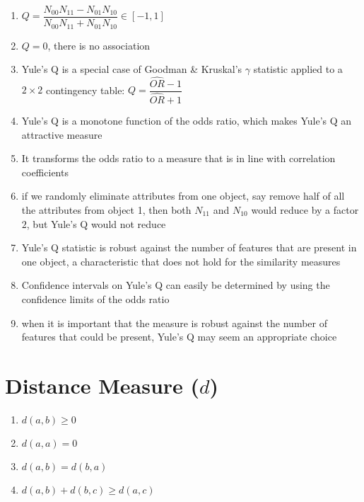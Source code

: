 \begin{enumerate}
    \item[] $Q = \dfrac{N_{00}N_{11} - N_{01}N_{10}}{N_{00}N_{11} + N_{01}N_{10}} \in [-1,1]$

    \item $Q = 0$, there is no association

    \item Yule’s Q is a special case of Goodman \& Kruskal’s $\gamma$ statistic applied to a $2 \times 2$ contingency table: $Q = \dfrac{\hat{OR} - 1}{\hat{OR} + 1}$

    \item Yule’s Q is a monotone function of the odds ratio, which makes Yule’s Q an attractive measure

    \item It transforms the odds ratio to a measure that is in line with correlation coefficients

    \item if we randomly eliminate attributes from one object, say remove half of all the attributes from object 1, then both $N_{11}$ and $N_{10}$ would reduce by a factor $2$, but Yule’s Q would not reduce

    \item Yule’s Q statistic is robust against the number of features that are present in one object, a characteristic that does not hold for the similarity measures

    \item Confidence intervals on Yule’s Q can easily be determined by using the confidence limits of the odds ratio

    \item when it is important that the measure is robust against the number of features that could be present, Yule’s Q may seem an appropriate choice
\end{enumerate}

\section{Distance Measure ($d$) \cite{ism-1}}

\begin{enumerate}
    \item $d(a, b) \geq 0$

    \item $d(a, a) = 0$

    \item $d(a, b) = d(b, a)$

    \item $d(a, b) + d(b, c) \geq d(a, c)$
\end{enumerate}










































